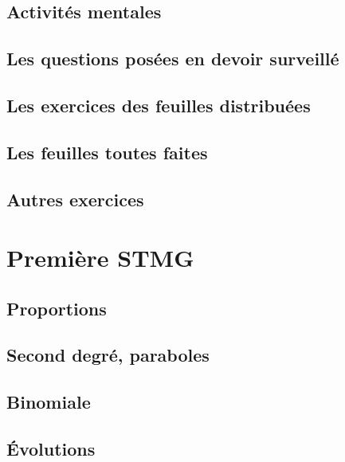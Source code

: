 \documentclass[a4paper,12pt]{book}
\begin{document}
\chapter{Activités mentales}


\chapter{Les questions posées en devoir surveillé}


\chapter{Les exercices des feuilles distribuées}


\chapter{Les feuilles toutes faites}


\chapter{Autres exercices}


\part{Première STMG}
\chapter{Proportions}


\chapter{Second degré, paraboles}


\chapter{Binomiale}


\chapter{Évolutions}

\end{document}
